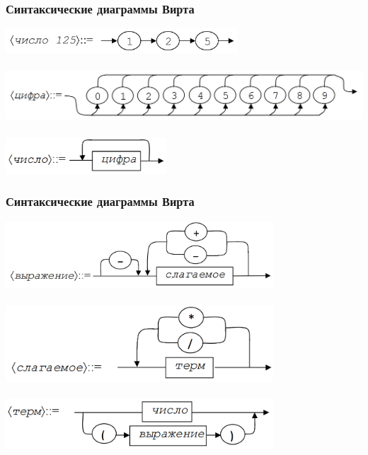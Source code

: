 \documentclass{beamer}
\begin{document}
\begin{frame}[fragile]
  \transwipe[direction=90]
  \frametitle{Синтаксические диаграммы Вирта}
\begin{center}
  \includegraphics[width=0.65\textwidth]{pics/sdseq.png}  \\~\\     \pause
  \includegraphics[width=1.0\textwidth]{pics/sddig.png}  \\~\\  \pause
  \includegraphics[width=0.45\textwidth]{pics/sdnum.png}
\end{center}
\end{frame}


\begin{frame}[fragile]
  \transwipe[direction=90]
  \frametitle{Синтаксические диаграммы Вирта}
\begin{center}
  \includegraphics[width=0.75\textwidth]{pics/sdexpr.png}  \\~\\     \pause
  \includegraphics[width=0.75\textwidth]{pics/sdfact.png}  \\~\\  \pause
  \includegraphics[width=0.75\textwidth]{pics/sdterm.png}
\end{center}
\end{frame}
\end{document}
